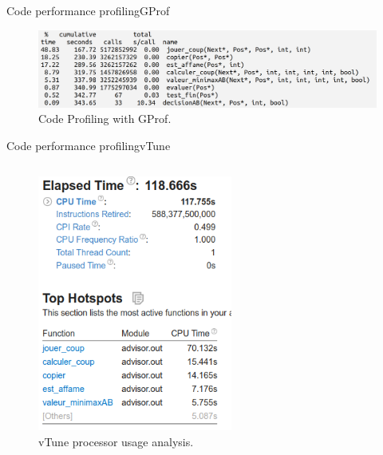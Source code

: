 \documentclass{beamer}
\begin{document}
\begin{frame}{Code performance profiling}{GProf}
\begin{figure}
        \includegraphics[width=\textwidth]{gprof.png}
        \caption{Code Profiling with GProf.\label{Fig:GProf}}
\end{figure}
\end{frame}

\begin{frame}{Code performance profiling}{vTune}
\begin{columns}
    \column{6.5cm}
    \begin{figure}
      \centering
   \includegraphics[width=0.75\textwidth]{vtune.png}
   \caption{vTune processor usage analysis.\label{Fig:vTune_proc}}
    \end{figure}
    \column{6.5cm}
    \begin{figure}
      \centering

\end{figure}
\end{columns}
\end{frame}
\end{document}
